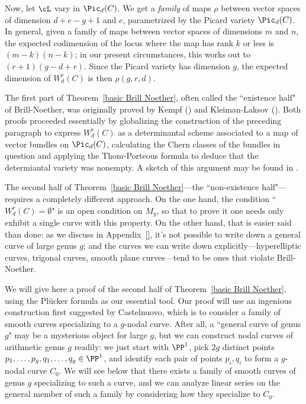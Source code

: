 Now, let $\cL$ vary in $\Pic_d(C)$. We get a \emph{family} of maps $\rho$ between vector spaces of dimension $d + e - g + 1$ and $e$, parametrized by the Picard variety $\Pic_d(C)$. In general, given a family of maps between vector spaces of dimensions $m$ and $n$, the expected codimension of the locus where the map has rank $k$ or less is $(m-k)(n-k)$; in our present circumstances, this works out to $(r+1)(g-d+r)$. Since the Picard variety has dimension $g$, the expected dimension of $W^r_d(C)$ is then $\rho(g,r,d)$.

The first part of Theorem~\ref{basic Brill Noether}, often called the ``existence half" of Brill-Noether, was originally proved by Kempf (\cite{}) and Kleiman-Laksov (\cite{}). Both proofs proceeded essentially by globalizing the construction of the preceding paragraph to express $W^r_d(C)$ as a determinantal scheme associated to a map of vector bundles on $\Pic_d(C)$, calculating the Chern classes of the bundles in question and applying the Thom-Porteous formula to deduce that the determiantal variety was nonempty. A sketch of this argument may  be found in \cite[Appendix D.3]{3264}.  

The second half of Theorem~\ref{basic Brill Noether}---the ``non-existence half"---requires a completely different approach. On the one hand, the condition ``$W^r_d(C) = \emptyset$" is an open condition on $M_g$, so that to prove it one needs only exhibit a single curve with this property. On the other hand, that is easier said than done: as we discuss in Appendix~\ref{}, it's not possible to write down a general curve of large genus $g$; and the curves we can write down explicitly---hyperelliptic curves, trigonal curves, smooth plane curves---tend to be ones that violate Brill-Noether.

We will give here a proof of the second half of Theorem~\ref{basic Brill Noether}, using the Pl\"ucker formula as our essential tool.
Our proof will use an ingenious construction first suggested by Castelnuovo, which is to consider a family of smooth curves specializing to a $g$-nodal curve. After all, 
a ``general curve of genus $g$" may be a mysterious object for large $g$, but we can construct nodal curves of arithmetic genus $g$ readily: we just start with $\PP^1$, pick $2g$ distinct points $p_1,\dots,p_g, q_1,\dots,q_g \in \PP^1$, and identify each pair of points $p_i, q_i$ to form a $g$-nodal curve $C_0$. We will see below that there exists a family of smooth curves of genus $g$ specializing to such a curve, and we can analyze linear series on the general member of such a family by considering how they specialize to $C_0$.

